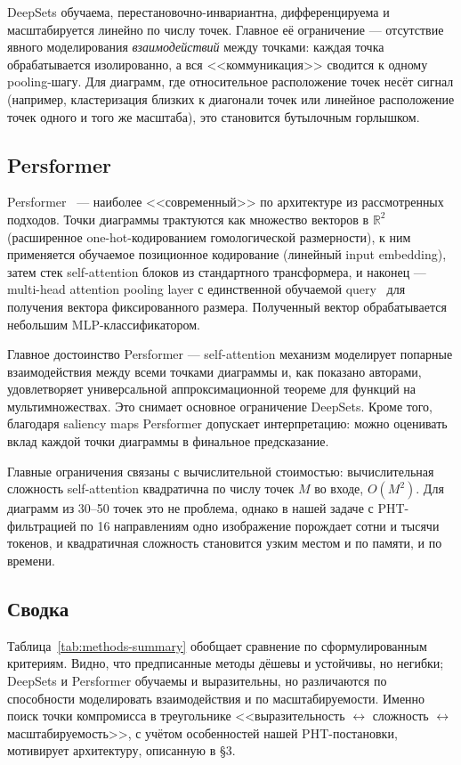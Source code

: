 DeepSets обучаема, перестановочно-инвариантна, дифференцируема и масштабируется линейно по числу точек. Главное её ограничение --- отсутствие явного моделирования \emph{взаимодействий} между точками: каждая точка обрабатывается изолированно, а вся <<коммуникация>> сводится к одному pooling-шагу. Для диаграмм, где относительное расположение точек несёт сигнал (например, кластеризация близких к диагонали точек или линейное расположение точек одного и того же масштаба), это становится бутылочным горлышком.

\subsection{Persformer}
\label{ssec:persformer}

Persformer~\cite{reinauerPersformerTransformerArchitecture2021} --- наиболее <<современный>> по архитектуре из рассмотренных подходов. Точки диаграммы трактуются как множество векторов в $\mathbb{R}^2$ (расширенное one-hot-кодированием гомологической размерности), к ним применяется обучаемое позиционное кодирование (линейный input embedding), затем стек self-attention блоков из стандартного трансформера, и наконец --- multi-head attention pooling layer с единственной обучаемой query~\cite{leeSetTransformer2019} для получения вектора фиксированного размера. Полученный вектор обрабатывается небольшим MLP-классификатором.

Главное достоинство Persformer --- self-attention механизм моделирует попарные взаимодействия между всеми точками диаграммы и, как показано авторами, удовлетворяет универсальной аппроксимационной теореме для функций на мультимножествах. Это снимает основное ограничение DeepSets. Кроме того, благодаря saliency maps Persformer допускает интерпретацию: можно оценивать вклад каждой точки диаграммы в финальное предсказание.

Главные ограничения связаны с вычислительной стоимостью: вычислительная сложность self-attention квадратична по числу точек $M$ во входе, $O(M^2)$. Для диаграмм из 30--50 точек это не проблема, однако в нашей задаче с PHT-фильтрацией по 16 направлениям одно изображение порождает сотни и тысячи токенов, и квадратичная сложность становится узким местом и по памяти, и по времени.

\subsection{Сводка}
Таблица~\ref{tab:methods-summary} обобщает сравнение по сформулированным критериям. Видно, что предписанные методы дёшевы и устойчивы, но негибки; DeepSets и Persformer обучаемы и выразительны, но различаются по способности моделировать взаимодействия и по масштабируемости. Именно поиск точки компромисса в треугольнике <<выразительность $\leftrightarrow$ сложность $\leftrightarrow$ масштабируемость>>, с учётом особенностей нашей PHT-постановки, мотивирует архитектуру, описанную в §3.

